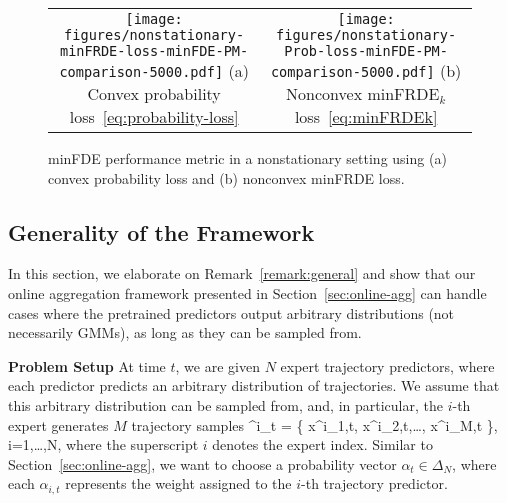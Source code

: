 \begin{figure}[h]
    \begin{minipage}{\columnwidth}
        \begin{tabular}{cc}
            \hspace{-8mm}
            \begin{minipage}{0.5\textwidth}
            \centering
            \texttt{[image: figures/nonstationary-minFRDE-loss-minFDE-PM-comparison-5000.pdf]}
            {(a) Convex probability loss~\eqref{eq:probability-loss}}
            \end{minipage}
            &
            \begin{minipage}{0.5\textwidth}
            \centering
            \texttt{[image: figures/nonstationary-Prob-loss-minFDE-PM-comparison-5000.pdf]}
            {(b) Nonconvex minFRDE$_k$ loss~\eqref{eq:minFRDEk}}
            \end{minipage}
            \\
        \end{tabular}
    \end{minipage}
    \caption{minFDE performance metric in a nonstationary setting using (a) convex probability loss and (b) nonconvex minFRDE loss. 
    \label{fig:nonstationary-extra}}
    \vspace{2mm}
\end{figure}


\subsection{Generality of the Framework}
\label{app:generality}

In this section, we elaborate on Remark~\ref{remark:general} and show that our online aggregation framework presented in Section~\ref{sec:online-agg} can handle cases where the pretrained predictors output arbitrary distributions (\ie not necessarily GMMs), as long as they can be sampled from.

{\bf Problem Setup} At time $t$, we are given $N$ expert trajectory predictors, where each predictor predicts an arbitrary distribution of trajectories. We assume that this arbitrary distribution can be sampled from, and, in particular, the $i$-th expert generates $M$ trajectory samples
\bea 
\calT^i_t = \{ x^i_{1,t}, x^i_{2,t},\dots, x^i_{M,t} \}, \quad i=1,\dots,N,
\eea
where the superscript $i$ denotes the expert index. Similar to Section~\ref{sec:online-agg}, we want to choose a probability vector $\alpha_t \in \Delta_N$, where each $\alpha_{i,t}$ represents the weight assigned to the $i$-th trajectory predictor. 

